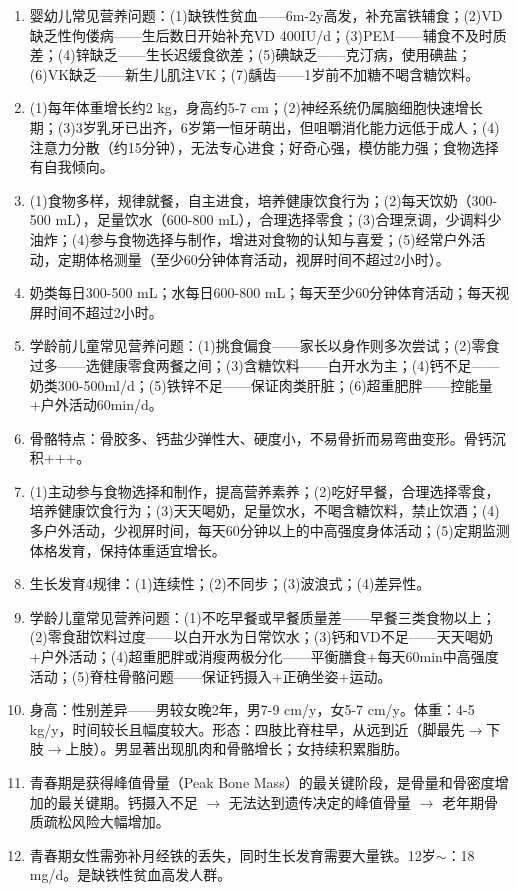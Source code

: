 {\begin{enumerate}[leftmargin=*, itemsep=5pt]
    \item 婴幼儿常见营养问题：(1)缺铁性贫血——6m-2y高发，补充富铁辅食；(2)VD缺乏性佝偻病——生后数日开始补充VD 400IU/d；(3)PEM——辅食不及时质差；(4)锌缺乏——生长迟缓食欲差；(5)碘缺乏——克汀病，使用碘盐；(6)VK缺乏——新生儿肌注VK；(7)龋齿——1岁前不加糖不喝含糖饮料。
    \item (1)每年体重增长约2 kg，身高约5-7 cm；(2)神经系统仍属脑细胞快速增长期；(3)3岁乳牙已出齐，6岁第一恒牙萌出，但咀嚼消化能力远低于成人；(4)注意力分散（约15分钟），无法专心进食；好奇心强，模仿能力强；食物选择有自我倾向。
    \item (1)食物多样，规律就餐，自主进食，培养健康饮食行为；(2)每天饮奶（300-500 mL），足量饮水（600-800 mL），合理选择零食；(3)合理烹调，少调料少油炸；(4)参与食物选择与制作，增进对食物的认知与喜爱；(5)经常户外活动，定期体格测量（至少60分钟体育活动，视屏时间不超过2小时）。
    \item 奶类每日300-500 mL；水每日600-800 mL；每天至少60分钟体育活动；每天视屏时间不超过2小时。
    \item 学龄前儿童常见营养问题：(1)挑食偏食——家长以身作则多次尝试；(2)零食过多——选健康零食两餐之间；(3)含糖饮料——白开水为主；(4)钙不足——奶类300-500ml/d；(5)铁锌不足——保证肉类肝脏；(6)超重肥胖——控能量+户外活动60min/d。
    \item 骨骼特点：骨胶多、钙盐少弹性大、硬度小，不易骨折而易弯曲变形。骨钙沉积+++。
    \item (1)主动参与食物选择和制作，提高营养素养；(2)吃好早餐，合理选择零食，培养健康饮食行为；(3)天天喝奶，足量饮水，不喝含糖饮料，禁止饮酒；(4)多户外活动，少视屏时间，每天60分钟以上的中高强度身体活动；(5)定期监测体格发育，保持体重适宜增长。
    \item 生长发育4规律：(1)连续性；(2)不同步；(3)波浪式；(4)差异性。
    \item 学龄儿童常见营养问题：(1)不吃早餐或早餐质量差——早餐三类食物以上；(2)零食甜饮料过度——以白开水为日常饮水；(3)钙和VD不足——天天喝奶+户外活动；(4)超重肥胖或消瘦两极分化——平衡膳食+每天60min中高强度活动；(5)脊柱骨骼问题——保证钙摄入+正确坐姿+运动。
    \item 身高：性别差异——男较女晚2年，男7-9 cm/y，女5-7 cm/y。体重：4-5 kg/y，时间较长且幅度较大。形态：四肢比脊柱早，从远到近（脚最先$\rightarrow$下肢$\rightarrow$上肢）。男显著出现肌肉和骨骼增长；女持续积累脂肪。
    \item 青春期是获得峰值骨量（Peak Bone Mass）的最关键阶段，是骨量和骨密度增加的最关键期。钙摄入不足 $\rightarrow$ 无法达到遗传决定的峰值骨量 $\rightarrow$ 老年期骨质疏松风险大幅增加。
    \item 青春期女性需弥补月经铁的丢失，同时生长发育需要大量铁。12岁$\sim$：18 mg/d。是缺铁性贫血高发人群。

\end{enumerate}}
